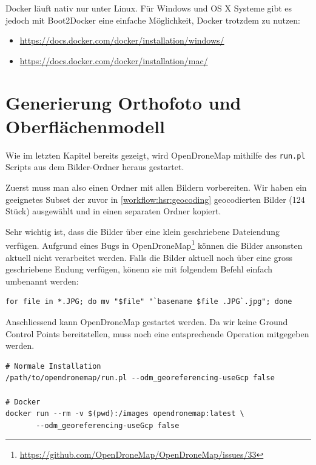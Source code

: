 Docker läuft nativ nur unter Linux. Für Windows und OS X Systeme gibt es jedoch
mit Boot2Docker eine einfache Möglichkeit, Docker trotzdem zu nutzen:

\begin{itemize}
	\item \url{https://docs.docker.com/docker/installation/windows/}
	\item \url{https://docs.docker.com/docker/installation/mac/}
\end{itemize}


\section{Generierung Orthofoto und Oberflächenmodell}

\label{workflow:hsr:generate}

Wie im letzten Kapitel bereits gezeigt, wird OpenDroneMap mithilfe des
\texttt{run.pl} Scripts aus dem Bilder-Ordner heraus gestartet.

Zuerst muss man also einen Ordner mit allen Bildern vorbereiten. Wir haben ein
geeignetes Subset der zuvor in \autoref{workflow:hsr:geocoding} geocodierten
Bilder (124 Stück) ausgewählt und in einen separaten Ordner kopiert.

Sehr wichtig ist, dass die Bilder über eine klein geschriebene Dateiendung
verfügen. Aufgrund eines Bugs in
OpenDroneMap\footnote{\url{https://github.com/OpenDroneMap/OpenDroneMap/issues/33}}
können die Bilder ansonsten aktuell nicht verarbeitet werden. Falls die Bilder
aktuell noch über eine gross geschriebene Endung verfügen, könenn sie mit
folgendem Befehl einfach umbenannt werden:

\vspace{0.5\baselineskip}
\begin{verbatim} 
for file in *.JPG; do mv "$file" "`basename $file .JPG`.jpg"; done
\end{verbatim}

Anschliessend kann OpenDroneMap gestartet werden. Da wir keine Ground Control
Points bereitstellen, muss noch eine entsprechende Operation mitgegeben werden.

\vspace{0.5\baselineskip}
\begin{verbatim} 
# Normale Installation
/path/to/opendronemap/run.pl --odm_georeferencing-useGcp false

# Docker
docker run --rm -v $(pwd):/images opendronemap:latest \
       --odm_georeferencing-useGcp false
\end{verbatim}

